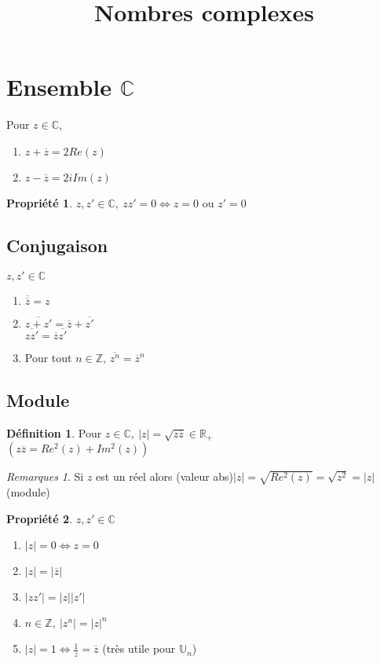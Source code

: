 \documentclass[fleqn]{article}
\title{Nombres complexes}
\date{}
\theoremstyle{definition} \newtheorem*{defi}{D\'efinition}
\theoremstyle{definition} \newtheorem*{theo}{Th\'eor\`eme}
\theoremstyle{definition} \newtheorem*{coro}{Corollaire}
\theoremstyle{remark} \newtheorem*{rqs}{Remarques}
\theoremstyle{definition} \newtheorem*{prop}{Propri\'et\'e}
\begin{document}
\maketitle

\section{Ensemble $\mathbb{C}$}
Pour $z \in \mathbb{C}$,
\begin{enumerate}
	\item $z + \overline{z} = 2Re(z)$
	\item $z - \overline{z} = 2iIm(z)$
\end{enumerate}

\begin{prop}
	$z,z' \in \mathbb{C},\ zz' = 0 \Leftrightarrow z = 0$ ou $z' = 0$
\end{prop}

\subsection{Conjugaison}
$z,z' \in \mathbb{C}$
\begin{enumerate}
	\item $\overline{\overline{z}} = z$
	\item $\overline{z + z'} = \overline{z} + \overline{z'}$\\
		$\overline{zz'} = \overline{z} \overline{z'}$
	\item Pour tout $n \in \mathbb{Z}$, $\overline{z^n} = \overline{z}^n$
\end{enumerate}

\subsection{Module}
\begin{defi}
	Pour $z \in \mathbb{C},\ |z| = \sqrt{z\overline{z}} \in \mathbb{R}_+$ \\
	$(z\overline{z} = Re^2(z) + Im^2(z))$
	\begin{rqs}
		Si $z$ est un r\'eel alors (valeur abs)$|z| = \sqrt{Re^2(z)} = \sqrt{z^2} = |z|$(module)
	\end{rqs}
\end{defi}

\begin{prop} $z,z' \in \mathbb{C}$
	\begin{enumerate}
		\item $|z| = 0 \Leftrightarrow z = 0$
		\item $|z| = |\overline{z}|$
		\item $|zz'| = |z||z'|$
		\item $n \in \mathbb{Z},\ |z^n| = |z|^n$
		\item $|z| = 1 \Leftrightarrow \frac{1}{z} = \overline{z}$ (tr\`es utile pour $\mathbb{U}_n$)
	\end{enumerate}
\end{prop}
\end{document}
